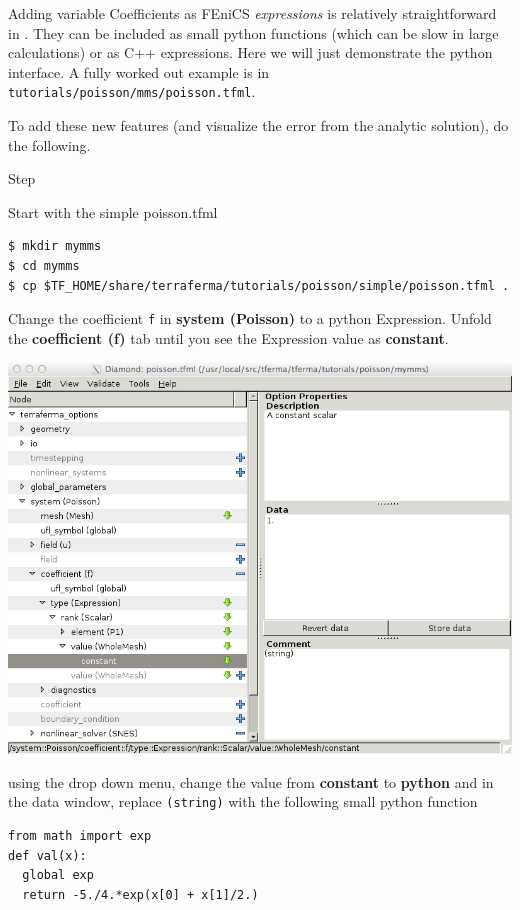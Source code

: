 Adding variable Coefficients as FEniCS \emph{expressions} is
relatively straightforward in \TF{}. They can be included as small
python functions (which can be slow in large calculations) or as C++
expressions.  Here we will just demonstrate the python interface.  A
fully worked out example is in \texttt{tutorials/poisson/mms/poisson.tfml}.

To add these new features (and visualize the error from the analytic solution), do the following.
\begin{steps}{Step}
\item  Start with the simple poisson.tfml
  \begin{lstlisting}[style=Bash]
$ mkdir mymms
$ cd mymms
$ cp $TF_HOME/share/terraferma/tutorials/poisson/simple/poisson.tfml .    
  \end{lstlisting}
\item Change the coefficient \texttt{f} in \textbf{system (Poisson)} to a python Expression. Unfold the \textbf{coefficient (f)} tab until you see the Expression value as \textbf{constant}. 
\begin{center}
\includegraphics[width=\diamondwidth]{figures/screendumps/diamond_poisson_f_value.png}
  \end{center}
\item using the drop down menu, change the value from \textbf{constant} to \textbf{python} and in the data window, replace \texttt{(string)} with the following small python function
  \begin{lstlisting}[style=python]
from math import exp
def val(x):
  global exp
  return -5./4.*exp(x[0] + x[1]/2.)   

\end{lstlisting}
\end{steps}
